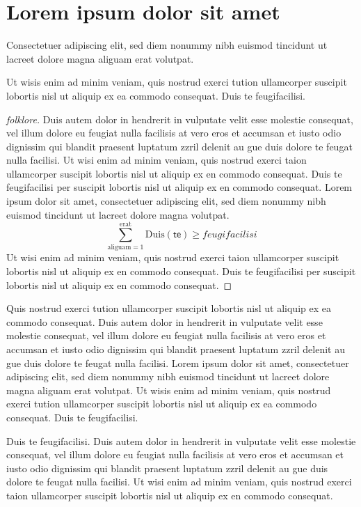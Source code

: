 \documentclass[12pt]{report}
\begin{document}
\section{Lorem ipsum dolor sit amet}

Consectetuer adipiscing elit, sed diem nonummy nibh euismod tincidunt
ut lacreet dolore magna aliguam erat volutpat. 

\begin{theorem}
Ut wisis enim ad minim veniam, quis nostrud exerci tution
ullamcorper suscipit lobortis nisl ut aliquip ex ea commodo consequat. 
Duis te feugifacilisi. 
\end{theorem}

\begin{proof}[folklore]
Duis autem dolor in hendrerit in vulputate velit esse molestie
consequat, vel illum dolore eu feugiat nulla facilisis at vero eros et
accumsan et iusto odio dignissim qui blandit praesent luptatum zzril
delenit au gue duis dolore te feugat nulla facilisi.  Ut wisi enim ad
minim veniam, quis nostrud exerci taion ullamcorper suscipit lobortis
nisl ut aliquip ex en commodo consequat.  Duis te feugifacilisi per
suscipit lobortis nisl ut aliquip ex en commodo consequat.  Lorem
ipsum dolor sit amet, consectetuer adipiscing elit, sed diem nonummy
nibh euismod tincidunt ut lacreet dolore magna
volutpat. 
\begin{equation}
\sum_{\text{aliguam}=1}^{\text{erat}}
	\mathrm{Duis}(\mathsf{te}) \ge \mathit{feugifacilisi}
\end{equation}
Ut wisi enim ad minim veniam, quis nostrud exerci taion ullamcorper
suscipit lobortis nisl ut aliquip ex en commodo consequat.  Duis te
feugifacilisi per suscipit lobortis nisl ut aliquip ex en commodo
consequat. 
\end{proof}

Quis nostrud exerci tution ullamcorper suscipit lobortis nisl ut
aliquip ex ea commodo consequat.  Duis autem dolor in hendrerit in
vulputate velit esse molestie consequat, vel illum dolore eu feugiat
nulla facilisis at vero eros et accumsan et iusto odio dignissim qui
blandit praesent luptatum zzril delenit au gue duis dolore te feugat
nulla facilisi.  Lorem ipsum dolor sit amet, consectetuer adipiscing
elit, sed diem nonummy nibh euismod tincidunt ut lacreet dolore magna
aliguam erat volutpat.  Ut wisis enim ad minim veniam, quis nostrud
exerci tution ullamcorper suscipit lobortis nisl ut aliquip ex ea
commodo consequat.  Duis te feugifacilisi. 

\begin{ddanger}
Duis te feugifacilisi.  Duis autem dolor in hendrerit in vulputate
velit esse molestie consequat, vel illum dolore eu feugiat nulla
facilisis at vero eros et accumsan et iusto odio dignissim qui blandit
praesent luptatum zzril delenit au gue duis dolore te feugat nulla
facilisi.  Ut wisi enim ad minim veniam, quis nostrud exerci taion
ullamcorper suscipit lobortis nisl ut aliquip ex en commodo
consequat.  
\end{ddanger}
\end{document}
